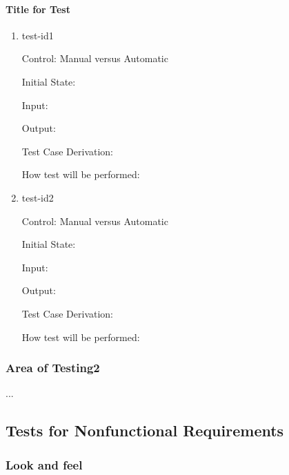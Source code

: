 \documentclass[12pt, titlepage]{article}
\begin{document}
\paragraph{Title for Test}

\begin{enumerate}

\item{test-id1\\}

Control: Manual versus Automatic
					
Initial State: 
					
Input: 
					
Output: 

Test Case Derivation: 
					
How test will be performed: 
					
\item{test-id2\\}

Control: Manual versus Automatic
					
Initial State: 
					
Input: 
					
Output: 

Test Case Derivation: 

How test will be performed: 

\end{enumerate}

\subsubsection{Area of Testing2}

...

\subsection{Tests for Nonfunctional Requirements}

\subsubsection{Look and feel}
		
\end{document}
